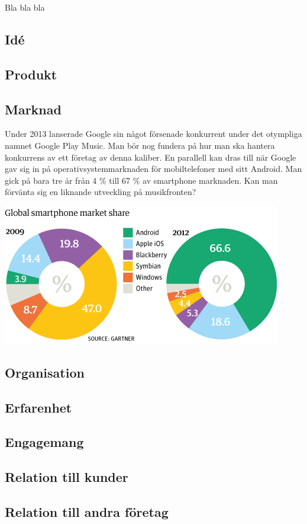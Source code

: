 Bla bla bla

\subsection{Idé}

\subsection{Produkt}


\subsection{Marknad}
Under 2013 lanserade Google sin något försenade konkurrent under det otympliga namnet Google Play Music. Man bör nog fundera på hur man ska hantera konkurrens av ett företag av denna kaliber. En parallell kan dras till när Google gav sig in på operativsystemmarknaden för mobiltelefoner med sitt Android. Man gick på bara tre år från 4 \% till 67 \% av smartphone marknaden. Kan man förvänta sig en liknande utveckling på musikfronten?

\includegraphics[width=\linewidth]{images/SmartPhoneMarket.png}

\subsection{Organisation}


\subsection{Erfarenhet}

\subsection{Engagemang}

\subsection{Relation till kunder}

\subsection{Relation till andra företag}

